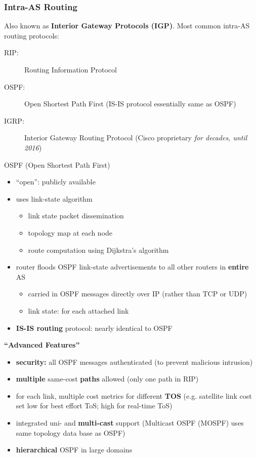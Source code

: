 \subsubsection{Intra-AS Routing}
Also known as \textbf{Interior Gateway Protocols (IGP)}. Most common intra-AS routing protocols:
\begin{description}
	\item[RIP:] Routing Information Protocol
	\item[OSPF:] Open Shortest Path First (IS-IS protocol essentially same as OSPF)
	\item[IGRP:] Interior Gateway Routing Protocol (Cisco proprietary \textit{for decades, until 2016})
\end{description}
\begin{note}{OSPF (Open Shortest Path First)}
	\begin{itemize}
		\item ``open'': publicly available
		\item uses link-state algorithm
		\begin{itemize}
			\item link state packet dissemination
			\item topology map at each node
			\item route computation using Dijkstra's algorithm
		\end{itemize}
		\item router floods OSPF link-state advertisements to all other routers in \textbf{entire} AS
		\begin{itemize}
			\item carried in OSPF messages directly over IP (rather than TCP or UDP)
			\item link state: for each attached link
		\end{itemize}
		\item \textbf{IS-IS routing} protocol: nearly identical to OSPF
	\end{itemize}\vspace{1em}
	\textbf{``Advanced Features''}
	\begin{itemize}
		\item \textbf{security:} all OSPF messages authenticated (to prevent malicious intrusion)
		\item \textbf{multiple} same-cost \textbf{paths} allowed (only one path in RIP)
		\item for each link, multiple cost metrics for different \textbf{TOS} (e.g. satellite link cost set low for best effort ToS; high for real-time ToS)
		\item integrated uni- and \textbf{multi-cast} support (Multicast OSPF (MOSPF) uses same topology data base as OSPF)
		\item \textbf{hierarchical} OSPF in large domains
	\end{itemize}
\end{note}\label{note:ospf}
